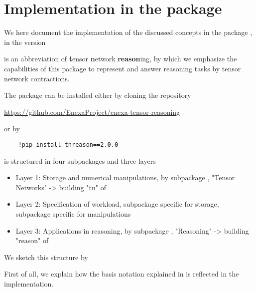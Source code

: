 \chapter{Implementation in the \tnreason package}\label{cha:implementation}

We here document the implementation of the discussed concepts in the \python package \tnreason, in the version \curvertnreason
 
\tnreason is an abbreviation of \textbf{t}ensor \textbf{n}etwork \textbf{reason}ing, by which we emphasize the capabilities of this package to represent and answer reasoning tasks by tensor network contractions. 

The package can be installed either by cloning the repository
\begin{center}
	\href{https://github.com/EnexaProject/enexa-tensor-reasoning}{https://github.com/EnexaProject/enexa-tensor-reasoning}
\end{center}
or by
\begin{lstlisting}
	!pip install tnreason==2.0.0
\end{lstlisting}


\tnreason is structured in four subpackages and three layers
\begin{itemize}
	\item Layer 1: Storage and numerical manipulations, by subpackage \spengine, "Tensor Networks" -> building "tn" of \tnreason
	\item Layer 2: Specification of workload, subpackage \sprepresentation specific for storage, subpackage \spreasoning specific for manipulations
	\item Layer 3: Applications in reasoning, by subpackage \spapplication, "Reasoning" -> building "reason" of \tnreason
\end{itemize}

We sketch this structure by
\begin{center}

\end{center}



First of all, we explain how the basis notation explained in  is reflected in the implementation.

